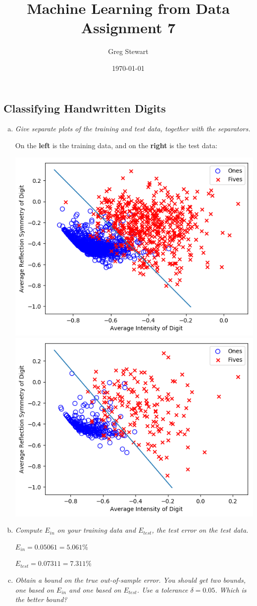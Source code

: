 \documentclass{article}
\title{Machine Learning from Data Assignment 7}
\author{Greg Stewart}
\date{\today}
\begin{document}
\maketitle

\subsection*{Classifying Handwritten Digits}

\begin{enumerate}[(a)]
  \item \textit{Give separate plots of the training and test data, together with the separators.}

    On the \textbf{left} is the training data, and on the \textbf{right} is the test data:

    \begin{center}
    \includegraphics[width=.45\textwidth]{./data/trainingplot.png}
    \includegraphics[width=.45\textwidth]{./data/testplot.png}
    \end{center}

  \item \textit{Compute $E_{in}$ on your training data and $E_{test}$, the test error on the test
    data.}

    $E_{in} = 0.05061 = 5.061\%$

    $E_{test} = 0.07311 = 7.311\%$

  \item \textit{Obtain a bound on the true out-of-sample error. You should get two bounds, one 
    based on $E_{in}$ and one based on $E_{test}$. Use a tolerance $\delta = 0.05$.
    Which is the better bound?}


\end{enumerate}
\end{document}
